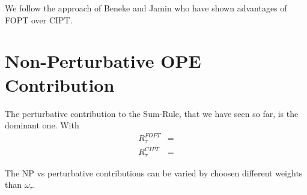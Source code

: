 \documentclass[../../index.tex]{subfiles}
\begin{document}
We follow the approach of Beneke and Jamin \cite{Benke2008} who have shown
advantages of FOPT over CIPT.


\section{Non-Perturbative OPE Contribution}
The perturbative contribution to the Sum-Rule, that we have seen so far, is the
dominant one. With
\begin{equation}
  \begin{split}
    R_\tau^{FOPT} &= \\ 
    R_\tau^{CIPT} &=  
  \end{split}
\end{equation}

The NP vs perturbative contributions can be varied by choosen different weights
than $\omega_\tau$.
\end{document}
